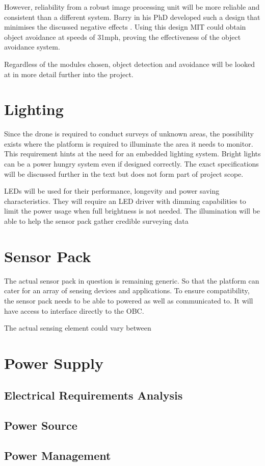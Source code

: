 			However, reliability from a robust image processing unit will be more reliable and consistent than a different system. Barry in his PhD developed such a design that minimises the discussed negative effects \cite{Barry2016}. Using this design MIT could obtain object avoidance at speeds of 31mph, proving the effectiveness of the object avoidance system.
			
			Regardless of the modules chosen, object detection and avoidance will be looked at in more detail further into the project.
			
		\section{Lighting}
		Since the drone is required to conduct surveys of unknown areas, the possibility exists where the platform is required to illuminate the area it needs to monitor. This requirement hints at the need for an embedded lighting system. Bright lights can be a power hungry system even if designed correctly. The exact specifications will be discussed further in the text but does not form part of project scope.
		
		LEDs will be used for their performance, longevity and power saving characteristics. They will require an LED driver with dimming capabilities to limit the power usage when full brightness is not needed. The illumination will be able to help the sensor pack gather credible surveying data
		
		
		\section{Sensor Pack}
		The actual sensor pack in question is remaining generic. So that the platform can cater for an array of sensing devices and applications. To ensure compatibility, the sensor pack needs to be able to powered as well as communicated to. It will have access to interface directly to the OBC.
		
		The actual sensing element could vary between 

		\section{Power Supply}
			\subsection{Electrical Requirements Analysis}
			\subsection{Power Source}
			\subsection{Power Management}


